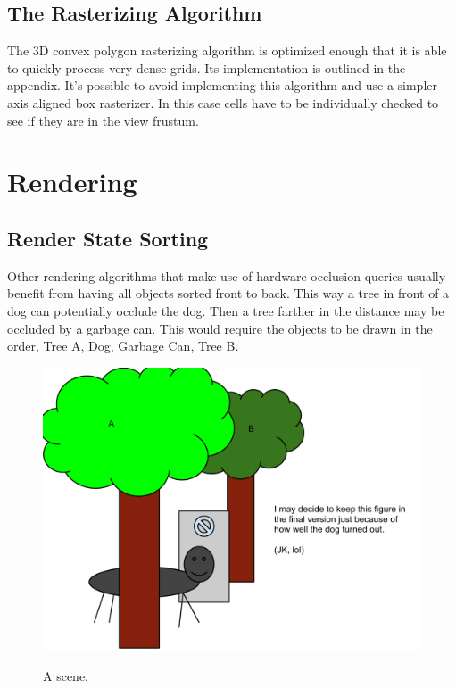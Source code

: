 \documentclass[12pt]{ucthesis}
\newcommand{\captionfonts}{\small\bf\ssp}
\begin{document}
\subsection{The Rasterizing Algorithm}
\label{the-rasterizing-algorithm}
The 3D convex polygon rasterizing algorithm is optimized enough that it is able to quickly process very dense grids.
Its implementation is outlined in the appendix.
It's possible to avoid implementing this algorithm and use a simpler axis aligned box rasterizer.
In this case cells have to be individually checked to see if they are in the view frustum.

\section{Rendering}
\label{rendering}

\subsection{Render State Sorting}
\label {render-state-sorting}
Other rendering algorithms that make use of hardware occlusion queries usually benefit from having all objects sorted front to back.
This way a tree in front of a dog can potentially occlude the dog.
Then a tree farther in the distance may be occluded by a garbage can.
This would require the objects to be drawn in the order, Tree A, Dog, Garbage Can, Tree B.

\begin{figure}
\begin{center}
\includegraphics[width=\textwidth]{Images/sample-scene.pdf}
\captionfonts
\caption[A scene]{A scene.}
\label{fig:a-scene}
\end{center}
\end{figure}
\end{document}
